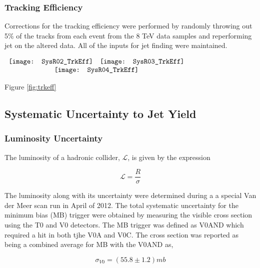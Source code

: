 \subsubsection{Tracking Efficiency}
Corrections for the tracking efficiency were performed by randomly throwing out 5\% of the tracks from each event from the 8 TeV data samples and reperforming jet on the altered data.  All of the inputs for jet finding were maintained.


\begin{figure*}[t!]
$\begin{array}{rl}
    \texttt{[image: SysR02\_TrkEff]} &
    \texttt{[image: SysR03\_TrkEff]}\\
    \multicolumn{2}{c}{\texttt{[image: SysR04\_TrkEff]}}
\end{array}$
\caption[Systematic due to TPC tracking efficiency.]{\label{fig:trkeff}Systematic due to TPC tracking efficiency.}
\end{figure*}

\noindent
Figure \ref{fig:trkeff}

\subsection{Systematic Uncertainty to Jet Yield}



\subsubsection{Luminosity Uncertainty}

The luminosity of a hadronic collider, $\mathscr{L}$, is given by the expression



\begin{equation}
\mathscr{L} = \frac{R}{\sigma}
\label{eq:xlumdef}
\end{equation}

The luminosity along with its uncertainty were determined during a a special Van der Meer scan run in April of 2012\cite{ALICE-PUBLIC-2017-002}.  The total systematic uncertainty for the minimum bias (MB) trigger were obtained by measuring the visible cross section using the T0 and V0 detectors.  The MB trigger was defined as V0AND which required a hit in both tjhe V0A and V0C.  The cross section was reported as being a combined average for MB with the V0AND as, 

\begin{equation}
\sigma_{V0} = (55.8 \pm 1.2) mb
\label{eq:xlumdef}
\end{equation}

